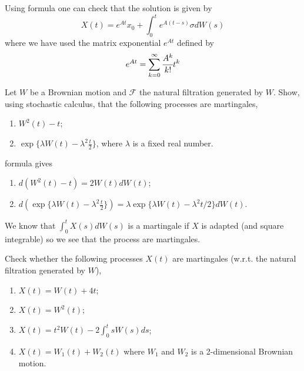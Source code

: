 \documentclass[12pt,a4paper]{exam}
\begin{document}
\begin{questions}
\begin{solution}
Using \ito formula one can check that the solution is given by
\begin{equation*}
X(t) = e^{At}x_0 + \int_0^te^{A(t-s)}\sigma dW(s)
\end{equation*}
where we have used the matrix exponential $e^{At}$ defined by
\begin{equation*}
e^{At} = \sum_{k=0}^{\infty} \cfrac{A^k}{k!}t^k
\end{equation*}
\end{solution}

\question Let $W$ be a Brownian motion and $\mathcal{F}$ the natural filtration generated by $W$. Show, using stochastic calculus, that the following processes are martingales,
\begin{enumerate}[label=(\alph*),font=\itshape]
\item $W^2(t) - t$;
\item $\exp\{\lambda W(t) - \lambda^2\frac{t}{2}\}$, where $\lambda$ is a fixed real number.
\end{enumerate}
\fillwithlines{3cm}

\begin{solution}
\ito formula gives
\begin{enumerate}[label=(\alph*),font=\itshape]
\item $d(W^2(t) - t) = 2W(t)dW(t)$;
\item $d(\exp\{\lambda W(t) - \lambda^2\frac{t}{2}\}) = \lambda\exp\{\lambda W(t) - \lambda^2t/2\}dW(t)$.
\end{enumerate}
We know that $\int_0^tX(s)dW(s)$ is a martingale if $X$ is adapted (and square integrable) so we see that the process are martingales.
\end{solution}

\question Check whether the following processes $X(t)$ are martingales (w.r.t. the natural filtration generated by $W$),
\begin{enumerate}[label=(\alph*),font=\itshape]
\item $X(t) = W(t) + 4t$;
\item $X(t) = W^2(t)$;
\item $X(t) = t^2W(t) - 2\int_0^tsW(s)ds$;
\item $X(t) = W_1(t) + W_2(t)$ where $W_1$ and $W_2$ is a 2-dimensional Brownian motion.
\end{enumerate}
\fillwithlines{3cm}


\end{questions}
\end{document}
